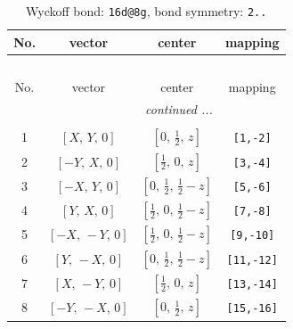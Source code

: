 \documentclass[fleqn,8pt]{jsarticle}
\begin{document}
\begin{longtable}{cccc}
\caption{Wyckoff bond: {\tt 16d@8g}, bond symmetry: {\tt 2..}}
 \\
 \hline \hline
No. & vector & center & mapping \\ \hline \endfirsthead

\multicolumn{3}{l}{\tablename\ \thetable{}} \\
 \hline \hline
No. & vector & center & mapping \\ \hline \endhead

 \hline \hline
\multicolumn{3}{r}{\footnotesize\it continued ...} \\ \endfoot

 \hline \hline
\multicolumn{3}{r}{} \\ \endlastfoot

1 & $\left[ X,\, Y,\, 0 \right]$ & $\left[ 0,\, \frac{1}{2},\, z \right]$ & {\tt [1,-2]} \\ \hline
2 & $\left[ - Y,\, X,\, 0 \right]$ & $\left[ \frac{1}{2},\, 0,\, z \right]$ & {\tt [3,-4]} \\ \hline
3 & $\left[ - X,\, Y,\, 0 \right]$ & $\left[ 0,\, \frac{1}{2},\, \frac{1}{2} - z \right]$ & {\tt [5,-6]} \\ \hline
4 & $\left[ Y,\, X,\, 0 \right]$ & $\left[ \frac{1}{2},\, 0,\, \frac{1}{2} - z \right]$ & {\tt [7,-8]} \\ \hline
5 & $\left[ - X,\, - Y,\, 0 \right]$ & $\left[ \frac{1}{2},\, 0,\, \frac{1}{2} - z \right]$ & {\tt [9,-10]} \\ \hline
6 & $\left[ Y,\, - X,\, 0 \right]$ & $\left[ 0,\, \frac{1}{2},\, \frac{1}{2} - z \right]$ & {\tt [11,-12]} \\ \hline
7 & $\left[ X,\, - Y,\, 0 \right]$ & $\left[ \frac{1}{2},\, 0,\, z \right]$ & {\tt [13,-14]} \\ \hline
8 & $\left[ - Y,\, - X,\, 0 \right]$ & $\left[ 0,\, \frac{1}{2},\, z \right]$ & {\tt [15,-16]} \\
\end{longtable}
\renewcommand{\arraystretch}{1.2}
\end{document}
